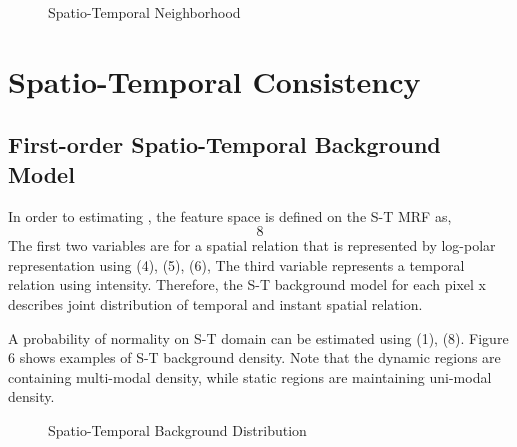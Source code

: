 \documentclass[a4paper,twocolumn, 10pt]{article}
\begin{document}
\begin{figure}[t]
  \centering
  \label{fig50}
  \caption{Spatio-Temporal Neighborhood}
\end{figure}


\section{Spatio-Temporal Consistency}

\subsection{First-order Spatio-Temporal Background Model}
In order to estimating  , the feature space is defined on the S-T MRF as,
\begin{equation}
  8
\end{equation}
The first two variables are for a spatial relation that is represented by log-polar representation using (4), (5), (6), The third variable represents a temporal relation using intensity. Therefore, the S-T background model for each pixel x describes joint distribution of temporal and instant spatial relation. 

A probability of normality   on S-T domain can be estimated using (1), (8). Figure 6 shows examples of S-T background density. Note that the dynamic regions are containing multi-modal density, while static regions are maintaining uni-modal density.

\begin{figure}[t]
  \centering
  \label{fig60}
  \caption{Spatio-Temporal Background Distribution}
\end{figure}
\end{document}
